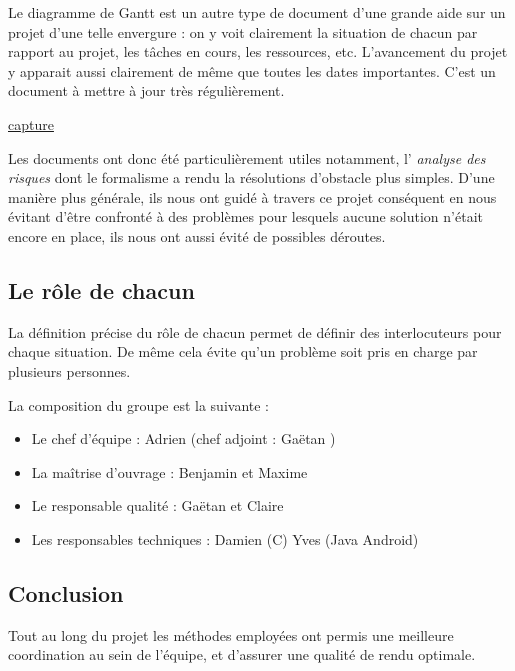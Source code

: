     Le diagramme de Gantt est un autre type de document d'une grande aide sur
    un projet d'une telle envergure : on y voit clairement la situation de
    chacun par rapport au projet, les tâches en cours, les ressources, etc.
    L'avancement du projet y apparait aussi clairement de même que toutes les
    dates importantes. C'est un document à mettre à jour très régulièrement.

    \href{../graphics/gantt2-0.png}{capture}

    Les documents ont donc été particulièrement utiles notamment, l'\emph{
    analyse des risques} dont le formalisme a rendu la résolutions d'obstacle
    plus simples. D'une manière plus générale, ils nous ont guidé à travers ce
    projet conséquent en nous évitant d'être confronté à des problèmes pour
    lesquels aucune solution n'était encore en place, ils nous ont aussi évité
    de possibles déroutes.

  \subsection{Le rôle de chacun}

    La définition précise du rôle de chacun permet de définir des
    interlocuteurs pour chaque situation. De même cela évite qu'un problème
    soit pris en charge par plusieurs personnes.

    La composition du groupe est la suivante :
    \begin{itemize}
      \item Le chef d'équipe : Adrien  (chef adjoint : Gaëtan
      )
      \item La maîtrise d'ouvrage : Benjamin  et Maxime 
      \item Le responsable qualité : Gaëtan  et Claire 
      \item Les responsables techniques : Damien  (C) Yves  (Java Android)
    \end{itemize}


  \subsection{Conclusion}

    Tout au long du projet les méthodes employées ont permis une meilleure
    coordination au sein de l'équipe, et d'assurer une qualité de rendu
    optimale.

